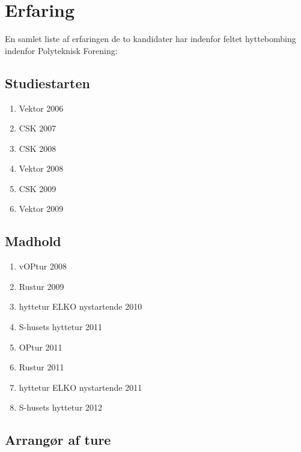 \section{Erfaring}
En samlet liste af erfaringen de to kandidater har indenfor feltet hyttebombing indenfor Polyteknisk Forening:

\subsection{Studiestarten}
\begin{enumerate}
\item Vektor 2006 \cite{bib:url:Beret2007}
\item CSK 2007\cite{bib:url:Beret2007}
\item CSK 2008\cite{bib:url:Beret2008}
\item Vektor 2008\cite{bib:url:Beret2008}
\item CSK 2009\cite{bib:url:Beret2009}
\item Vektor 2009\cite{bib:url:Beret2009}
\end{enumerate}

\subsection{Madhold}
\begin{enumerate}
\item vOPtur 2008\cite{bib:url:Beret2008}
\item Rustur 2009\cite{bib:url:Beret2009}
\item hyttetur ELKO nystartende 2010\cite{bib:url:Beret2010}
\item S-husets hyttetur 2011\cite{bib:url:Beret2011}
\item OPtur 2011\cite{bib:url:Beret2011}
\item Rustur 2011\cite{bib:url:Beret2011}
\item hyttetur ELKO nystartende 2011\cite{bib:url:Beret2011}
\item S-husets hyttetur 2012
\end{enumerate}


\subsection{Arrangør af ture}

